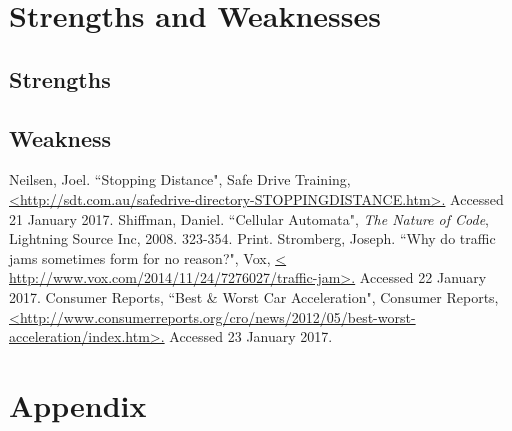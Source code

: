 \documentclass[a4paper]{article}
\begin{document}
\section{Strengths and Weaknesses}
	\subsection{Strengths}
	\subsection{Weakness}






	\newpage

	\begin{thebibliography}{0}
		 Neilsen, Joel. ``Stopping Distance", Safe Drive Training,  \url{<http://sdt.com.au/safedrive-directory-STOPPINGDISTANCE.htm>.} Accessed 21 January 2017.
		\bibitem{} Shiffman, Daniel. ``Cellular Automata", \textit{The Nature of Code}, Lightning Source Inc, 2008. 323-354. Print.
		 Stromberg, Joseph. ``Why do traffic jams sometimes form for no reason?", Vox, \url{< http://www.vox.com/2014/11/24/7276027/traffic-jam>.} Accessed 22 January 2017.
		 Consumer Reports, ``Best \& Worst Car Acceleration", Consumer Reports, \url{<http://www.consumerreports.org/cro/news/2012/05/best-worst-acceleration/index.htm>.} Accessed 23 January 2017.
	\end{thebibliography}








	\newpage

\section*{Appendix}
%


%


%
\end{document}
